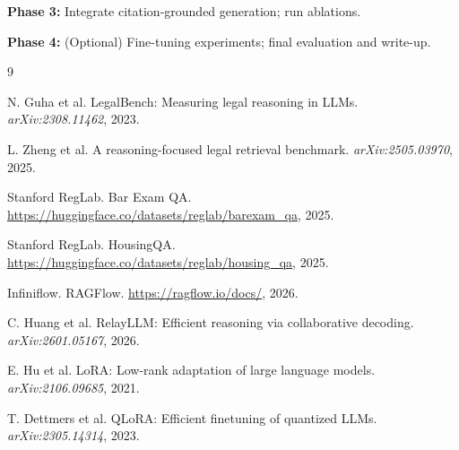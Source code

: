 \documentclass{article}
\begin{document}
\textbf{Phase 3:} Integrate citation-grounded generation; run ablations. 

\textbf{Phase 4:} (Optional) Fine-tuning experiments; final evaluation and write-up.

{\small

\begin{thebibliography}{9}

N. Guha et al.
LegalBench: Measuring legal reasoning in LLMs.
\emph{arXiv:2308.11462}, 2023.

L. Zheng et al.
A reasoning-focused legal retrieval benchmark.
\emph{arXiv:2505.03970}, 2025.

Stanford RegLab.
Bar Exam QA.
\url{https://huggingface.co/datasets/reglab/barexam_qa}, 2025.

Stanford RegLab.
HousingQA.
\url{https://huggingface.co/datasets/reglab/housing_qa}, 2025.

Infiniflow.
RAGFlow.
\url{https://ragflow.io/docs/}, 2026.

C. Huang et al.
RelayLLM: Efficient reasoning via collaborative decoding.
\emph{arXiv:2601.05167}, 2026.

E. Hu et al.
LoRA: Low-rank adaptation of large language models.
\emph{arXiv:2106.09685}, 2021.

T. Dettmers et al.
QLoRA: Efficient finetuning of quantized LLMs.
\emph{arXiv:2305.14314}, 2023.

\end{thebibliography}
}
\end{document}
